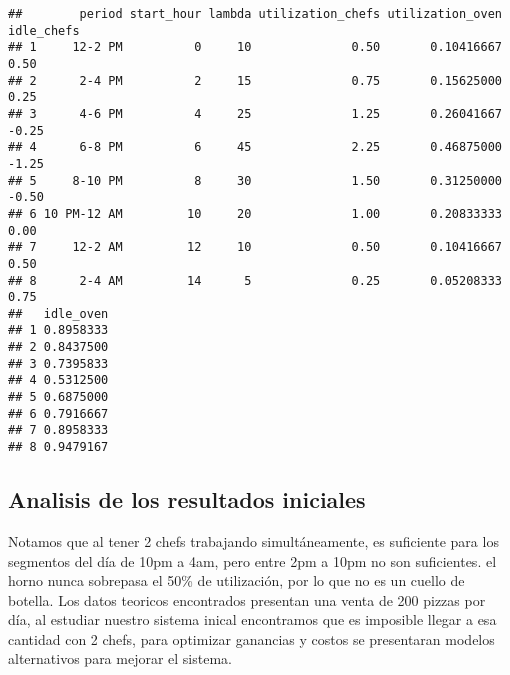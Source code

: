 \documentclass[
]{article}
\begin{document}
\begin{verbatim}
##        period start_hour lambda utilization_chefs utilization_oven idle_chefs
## 1     12-2 PM          0     10              0.50       0.10416667       0.50
## 2      2-4 PM          2     15              0.75       0.15625000       0.25
## 3      4-6 PM          4     25              1.25       0.26041667      -0.25
## 4      6-8 PM          6     45              2.25       0.46875000      -1.25
## 5     8-10 PM          8     30              1.50       0.31250000      -0.50
## 6 10 PM-12 AM         10     20              1.00       0.20833333       0.00
## 7     12-2 AM         12     10              0.50       0.10416667       0.50
## 8      2-4 AM         14      5              0.25       0.05208333       0.75
##   idle_oven
## 1 0.8958333
## 2 0.8437500
## 3 0.7395833
## 4 0.5312500
## 5 0.6875000
## 6 0.7916667
## 7 0.8958333
## 8 0.9479167
\end{verbatim}

\subsection{Analisis de los resultados
iniciales}\label{analisis-de-los-resultados-iniciales}

Notamos que al tener 2 chefs trabajando simultáneamente, es suficiente
para los segmentos del día de 10pm a 4am, pero entre 2pm a 10pm no son
suficientes. el horno nunca sobrepasa el 50\% de utilización, por lo que
no es un cuello de botella. Los datos teoricos encontrados presentan una
venta de 200 pizzas por día, al estudiar nuestro sistema inical
encontramos que es imposible llegar a esa cantidad con 2 chefs, para
optimizar ganancias y costos se presentaran modelos alternativos para
mejorar el sistema.
\end{document}
